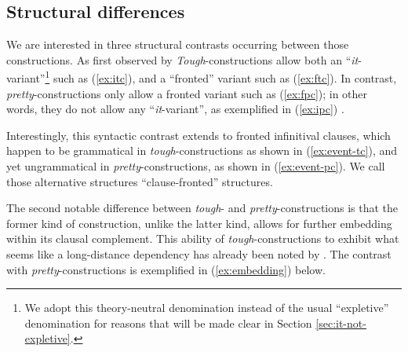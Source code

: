 \documentclass[11pt]{article}
\begin{document}
\subsection{Structural differences}
We are interested in three structural contrasts occurring between those constructions. As first observed by \cite{Lees1960,  Rosenbaum1967} \textit{Tough}-constructions allow both an ``\textit{it}-variant''\footnote{We adopt this theory-neutral denomination instead of the usual ``expletive'' denomination for reasons that will be made clear in Section \ref{sec:it-not-expletive}.} such as (\ref{ex:itc}), and a ``fronted'' variant such as (\ref{ex:ftc}). In contrast, \textit{pretty}-constructions only allow a fronted variant such as (\ref{ex:fpc}); in other words, they do not allow any ``\textit{it}-variant'', as exemplified in (\ref{ex:ipc}) \cite{Lasnik1974}.
\begin{exe}
	\ex 
	\begin{xlist}
		\label{ex:ftc}
		\label{ex:itc} 
	\end{xlist}
	\ex 
	\begin{xlist}
		\label{ex:fpc} 
		\label{ex:ipc} 
	\end{xlist}
\end{exe}\label{ex:it-variant}
Interestingly, this syntactic contrast extends to fronted infinitival clauses, which happen to be grammatical in \textit{tough}-constructions as shown in (\ref{ex:event-tc}), and yet ungrammatical in \textit{pretty}-constructions, as shown in (\ref{ex:event-pc}). We call those alternative structures ``clause-fronted'' structures.
\begin{exe}
	\ex 
	\begin{xlist}
		\label{ex:event-tc}
		\label{ex:event-pc}
	\end{xlist}
\end{exe}
The second notable difference between \textit{tough}- and \textit{pretty}-constructions is that the former kind of construction, unlike the latter kind, allows for further embedding within its clausal complement. This ability of \textit{tough}-constructions to exhibit what seems like a long-distance dependency has already been noted by \cite{Longenbaugh2017}. The contrast with \textit{pretty}-constructions is exemplified in (\ref{ex:embedding}) below.
\end{document}

